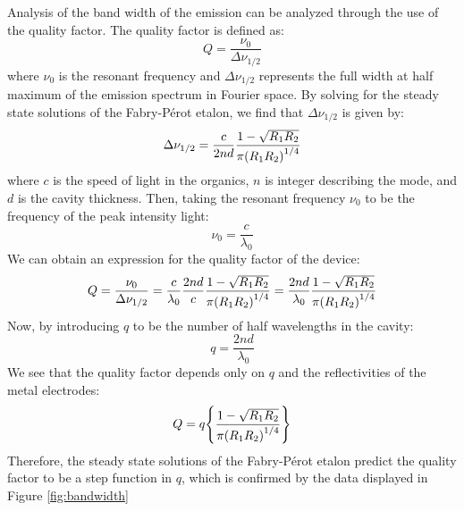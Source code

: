 \documentclass{report}
\begin{document}
            Analysis of the band width of the emission can be analyzed through the use of the quality factor. The quality factor is defined as:
            \begin{equation}
                Q=\frac{\nu_0}{\Delta\nu_{1/2}}
            \end{equation}
            where $\nu_0$ is the resonant frequency and $\Delta\nu_{1/2}$ represents the full width at half maximum of the emission spectrum in Fourier space.\cite{joseph1995laser} By solving for the steady state solutions of the Fabry-P\'erot etalon, we find that $\Delta\nu_{1/2}$ is given by:
            \begin{equation}
                \Delta\nu_{1/2}=\frac{c}{2nd}\frac{1-\sqrt{R_1R_2}}{\pi\qty(R_1R_2)^{1/4}}
            \end{equation}
            where $c$ is the speed of light in the organics, $n$ is integer describing the mode, and $d$ is the cavity thickness.\cite{joseph1995laser} Then, taking the resonant frequency $\nu_0$ to be the frequency of the peak intensity light:
            \begin{equation}
                \nu_0=\frac{c}{\lambda_0}
            \end{equation}
            We can obtain an expression for the quality factor of the device:
            \begin{equation}
                Q=\frac{\nu_0}{\Delta\nu_{1/2}}=\frac{c}{\lambda_0}\frac{2nd}{c}\frac{1-\sqrt{R_1R_2}}{\pi\qty(R_1R_2)^{1/4}}=\frac{2nd}{\lambda_0}\frac{1-\sqrt{R_1R_2}}{\pi\qty(R_1R_2)^{1/4}}
            \end{equation}
            Now, by introducing $q$ to be the number of half wavelengths in the cavity:
            \begin{equation}
                q=\frac{2nd}{\lambda_0}
            \end{equation}
            We see that the quality factor depends only on $q$ and the reflectivities of the metal electrodes:
            \begin{equation}
                Q=q\qty{\frac{1-\sqrt{R_1R_2}}{\pi\qty(R_1R_2)^{1/4}}}
                \label{eq:Q(q)}
            \end{equation}
            Therefore, the steady state solutions of the Fabry-P\'erot etalon predict the quality factor to be a step function in $q$, which is confirmed by the data displayed in Figure \ref{fig:bandwidth}
\end{document}
